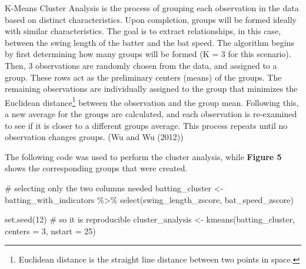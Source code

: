 \documentclass[
  letterpaper,
  DIV=11,
  numbers=noendperiod]{scrartcl}
\newenvironment{Shaded}{\begin{snugshade}}{\end{snugshade}}
\newcommand{\AttributeTok}[1]{\textcolor[rgb]{0.40,0.45,0.13}{#1}}
\newcommand{\CommentTok}[1]{\textcolor[rgb]{0.37,0.37,0.37}{#1}}
\newcommand{\DecValTok}[1]{\textcolor[rgb]{0.68,0.00,0.00}{#1}}
\newcommand{\FunctionTok}[1]{\textcolor[rgb]{0.28,0.35,0.67}{#1}}
\newcommand{\NormalTok}[1]{\textcolor[rgb]{0.00,0.23,0.31}{#1}}
\newcommand{\OtherTok}[1]{\textcolor[rgb]{0.00,0.23,0.31}{#1}}
\newcommand{\SpecialCharTok}[1]{\textcolor[rgb]{0.37,0.37,0.37}{#1}}
\begin{document}
K-Means Cluster Analysis is the process of grouping each observation in
the data based on distinct characteristics. Upon completion, groups will
be formed ideally with similar characteristics. The goal is to extract
relationships, in this case, between the swing length of the batter and
the bat speed. The algorithm begins by first determining how many groups
will be formed (K = 3 for this scenario). Then, 3 observations are
randomly chosen from the data, and assigned to a group. These rows act
as the preliminary centers (means) of the groups. The remaining
observations are individually assigned to the group that minimizes the
Euclidean distance\footnote{Euclidean distance is the straight line
  distance between two points in space.} between the observation and the
group mean. Following this, a new average for the groups are calculated,
and each observation is re-examined to see if it is closer to a
different groups average. This process repeats until no observation
changes groups. (Wu and Wu (2012))

The following code was used to perform the cluster analysis, while
\textbf{Figure 5} shows the corresponding groups that were created.

\begin{Shaded}
\begin{Highlighting}[]
\CommentTok{\# selecting only the two columns needed}
\NormalTok{batting\_cluster }\OtherTok{\textless{}{-}}\NormalTok{ batting\_with\_indicators }\SpecialCharTok{\%\textgreater{}\%}
  \FunctionTok{select}\NormalTok{(swing\_length\_zscore,}
\NormalTok{         bat\_speed\_zscore)}

\FunctionTok{set.seed}\NormalTok{(}\DecValTok{12}\NormalTok{) }\CommentTok{\# so it is reproducible}
\NormalTok{cluster\_analysis }\OtherTok{\textless{}{-}} \FunctionTok{kmeans}\NormalTok{(batting\_cluster,}
                           \AttributeTok{centers =} \DecValTok{3}\NormalTok{,}
                           \AttributeTok{nstart =} \DecValTok{25}\NormalTok{)}
\end{Highlighting}
\end{Shaded}
\end{document}

